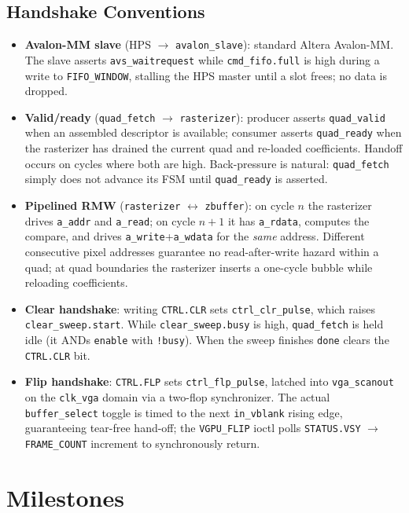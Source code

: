 \documentclass[11pt]{article}
\begin{document}
\subsection{Handshake Conventions}

\begin{itemize}
\item \textbf{Avalon-MM slave} (HPS $\rightarrow$ \texttt{avalon\_slave}): standard Altera Avalon-MM. The slave asserts \texttt{avs\_waitrequest} while \texttt{cmd\_fifo.full} is high during a write to \texttt{FIFO\_WINDOW}, stalling the HPS master until a slot frees; no data is dropped.
\item \textbf{Valid/ready} (\texttt{quad\_fetch} $\rightarrow$ \texttt{rasterizer}): producer asserts \texttt{quad\_valid} when an assembled descriptor is available; consumer asserts \texttt{quad\_ready} when the rasterizer has drained the current quad and re-loaded coefficients. Handoff occurs on cycles where both are high. Back-pressure is natural: \texttt{quad\_fetch} simply does not advance its FSM until \texttt{quad\_ready} is asserted.
\item \textbf{Pipelined RMW} (\texttt{rasterizer} $\leftrightarrow$ \texttt{zbuffer}): on cycle $n$ the rasterizer drives \texttt{a\_addr} and \texttt{a\_read}; on cycle $n{+}1$ it has \texttt{a\_rdata}, computes the compare, and drives \texttt{a\_write}+\texttt{a\_wdata} for the \emph{same} address. Different consecutive pixel addresses guarantee no read-after-write hazard within a quad; at quad boundaries the rasterizer inserts a one-cycle bubble while reloading coefficients.
\item \textbf{Clear handshake}: writing \texttt{CTRL.CLR} sets \texttt{ctrl\_clr\_pulse}, which raises \texttt{clear\_sweep.start}. While \texttt{clear\_sweep.busy} is high, \texttt{quad\_fetch} is held idle (it ANDs \texttt{enable} with \texttt{!busy}). When the sweep finishes \texttt{done} clears the \texttt{CTRL.CLR} bit.
\item \textbf{Flip handshake}: \texttt{CTRL.FLP} sets \texttt{ctrl\_flp\_pulse}, latched into \texttt{vga\_scanout} on the \texttt{clk\_vga} domain via a two-flop synchronizer. The actual \texttt{buffer\_select} toggle is timed to the next \texttt{in\_vblank} rising edge, guaranteeing tear-free hand-off; the \texttt{VGPU\_FLIP} ioctl polls \texttt{STATUS.VSY} $\rightarrow$ \texttt{FRAME\_COUNT} increment to synchronously return.
\end{itemize}

\section{Milestones}
\end{document}
